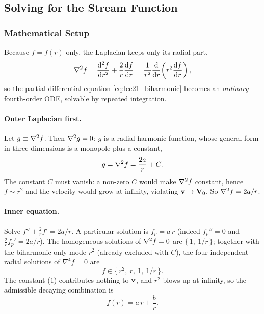 \documentclass[../main.tex]{subfiles}
\begin{document}
\subsection{Solving for the Stream Function}\label{sec:lec21:solve}

\subsubsection*{Mathematical Setup}
Because $f=f(r)$ only, the Laplacian keeps only its radial part,
\begin{equation}
  \nabla^2 f=\dv[2]{f}{r}+\frac{2}{r}\dv{f}{r}=\frac{1}{r^2}\dv{r}\!\left(r^2\dv{f}{r}\right),
  \label{eq:lec21_radial_lapl}
\end{equation}
so the partial differential equation \eqref{eq:lec21_biharmonic} becomes an \emph{ordinary} fourth-order ODE, solvable by repeated integration.

\paragraph{Outer Laplacian first.} Let $g\equiv\nabla^2 f$. Then $\nabla^2 g=0$: $g$ is a radial harmonic function, whose general form in three dimensions is a monopole plus a constant,
\begin{equation}
  g=\nabla^2 f=\frac{2a}{r}+C .
  \label{eq:lec21_g}
\end{equation}
The constant $C$ must vanish: a non-zero $C$ would make $\nabla^2 f$ constant, hence $f\sim r^2$ and the velocity would grow at infinity, violating $\mathbf{v}\to\mathbf{V}_0$. So $\nabla^2 f=2a/r$.

\paragraph{Inner equation.} Solve $f''+\tfrac{2}{r}f'=2a/r$. A particular solution is $f_p=a\,r$ (indeed $f_p''=0$ and $\tfrac{2}{r}f_p'=2a/r$). The homogeneous solutions of $\nabla^2 f=0$ are $\{\,1,\ 1/r\,\}$; together with the biharmonic-only mode $r^2$ (already excluded with $C$), the four independent radial solutions of $\nabla^4 f=0$ are
\begin{equation}
  f\in\big\{\,r^2,\ r,\ 1,\ 1/r\,\big\}.
  \label{eq:lec21_basis}
\end{equation}
The constant ($1$) contributes nothing to $\mathbf{v}$, and $r^2$ blows up at infinity, so the admissible decaying combination is
\begin{equation}
  f(r)=a\,r+\frac{b}{r}.
  \label{eq:lec21_f_general}
\end{equation}
\end{document}
